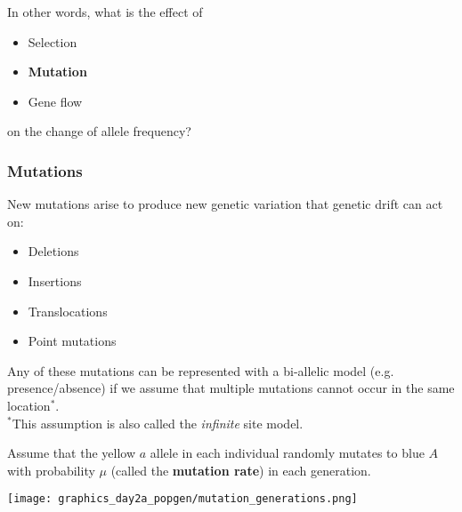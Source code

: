 \documentclass{beamer}
\newcommand{\1}{\ensuremath{\mathbf{1}}}
\begin{document}
%
%
%
\begin{frame}
	In other words, what is the effect of
	\begin{itemize}
		\item Selection
		\item \textbf{Mutation}
		\item Gene flow
	\end{itemize}
	on the change of allele frequency?
\end{frame}
%
%
%
\begin{frame}\frametitle{Mutations}
	New mutations arise to produce new genetic variation that genetic drift can act on:
	\begin{itemize}
		\item Deletions
		\item Insertions
		\item Translocations
		\item Point mutations
	\end{itemize}
	Any of these mutations can be represented with a bi-allelic model (e.g. presence/absence) if we assume that multiple mutations cannot occur in the same location$^{*}$.\\[2ex]
	{\footnotesize $^{*}$This assumption is also called the \emph{infinite} site model.}
\end{frame}
%
%
%
\begin{frame}
	Assume that the yellow $a$ allele in each individual randomly mutates to blue $A$ with probability $\mu$ (called the \textbf{mutation rate}) in each generation.
	\begin{center}
		\texttt{[image: graphics\_day2a\_popgen/mutation\_generations.png]}
	\end{center}
\end{frame}
%
%
%
\end{document}
